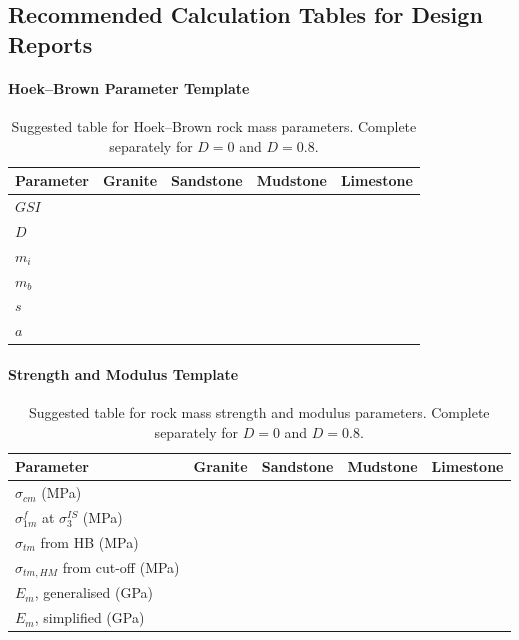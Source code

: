 \subsection{Recommended Calculation Tables for Design Reports}

\paragraph{Hoek--Brown Parameter Template}

\begin{table}[H]
\centering
\small
\begin{tabularx}{0.95\textwidth}{l c c c c}
\toprule
\textbf{Parameter} & \textbf{Granite} & \textbf{Sandstone} & \textbf{Mudstone} & \textbf{Limestone} \\
\midrule
\(GSI\) & & & & \\
\(D\) & & & & \\
\(m_i\) & & & & \\
\(m_b\) & & & & \\
\(s\) & & & & \\
\(a\) & & & & \\
\bottomrule
\end{tabularx}
\caption{Suggested table for Hoek--Brown rock mass parameters. Complete separately for \(D=0\) and \(D=0.8\).}
\label{tab:hb_template}
\end{table}

\paragraph{Strength and Modulus Template}

\begin{table}[H]
\centering
\small
\begin{tabularx}{0.95\textwidth}{l c c c c}
\toprule
\textbf{Parameter} & \textbf{Granite} & \textbf{Sandstone} & \textbf{Mudstone} & \textbf{Limestone} \\
\midrule
\(\sigma_{cm}\) (MPa) & & & & \\
\(\sigma_{1m}^f\) at \(\sigma_3^{IS}\) (MPa) & & & & \\
\(\sigma_{tm}\) from HB (MPa) & & & & \\
\(\sigma_{tm,HM}\) from cut-off (MPa) & & & & \\
\(E_m\), generalised (GPa) & & & & \\
\(E_m\), simplified (GPa) & & & & \\
\bottomrule
\end{tabularx}
\caption{Suggested table for rock mass strength and modulus parameters. Complete separately for \(D=0\) and \(D=0.8\).}
\label{tab:strength_template}
\end{table}

